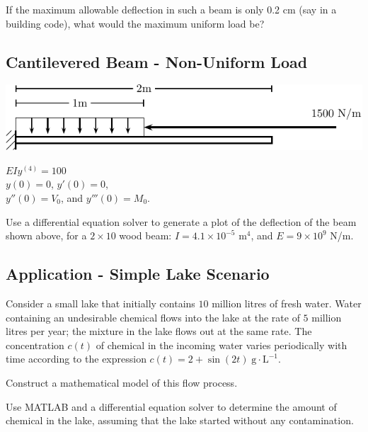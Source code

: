 \newpage
\problem If the maximum allowable deflection in such a beam is only
0.2 cm (say in a building code), what would the maximum uniform load
be?

\newpage

\subsection*{Cantilevered Beam - Non-Uniform Load}

\begin{minipage}[t]{0.55\linewidth}
\vspace{0pt}
\includegraphics[width=1.0\linewidth]{graphics/notes_09_beams2}
\end{minipage}
\begin{minipage}[t]{0.45\linewidth}
  \vspace{0pt}
  $EI y^{(4)} = 100$ \\
  $y(0) = 0$, $y'(0) = 0$,  \\
  $y''(0) = V_0$, and $y'''(0) = M_0$.
\end{minipage}

\problem Use a differential equation solver to generate a plot of the
deflection of the beam shown above, for a $2\times10$ wood beam:
$I = 4.1 \times 10^{-5}$ m$^4$, and $E = 9 \times 10^9$ N/m.

\newpage

\subsection{Application - Simple Lake Scenario}
Consider a small lake that initially contains $10$ million litres of
fresh water.  Water containing an undesirable chemical flows into the
lake at the rate of $5$ million litres per year; the mixture in the
lake flows out at the same rate.  The concentration $c(t)$ of chemical
in the incoming water varies periodically with time according to the
expression $c(t) = 2 + \sin(2t) \; \text{g} \cdot \text{L}^{-1}$.

  \problem Construct a mathematical model of this flow process.

\newpage
\problem Use MATLAB and a differential equation solver to determine
the amount of chemical in the lake, assuming that the lake started
without any contamination.

